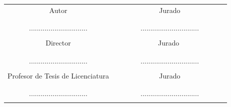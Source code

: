 \begin{center}
\begin{tabular}{|c|c|}
\hline
Autor &  \,\,\,\,\, \,\,\,\,\,\,\,\,\, \,\,\,\,\,\,\,\,\,\,\,\,\,\,\,\,\,\,Jurado \,\,\,\,\,\,\,\,\,\,\,\,\,\,\,\,\,\,\,\, \,\,\,\,\,\,\,\,\,\,\,\, \\
&            \\
       &            \\
  ..............................            &     ..............................          \\
       &            \\

\hline
Director &      \,\,\,\,\, \,\,\,\,\,\,\,\,\, \,\,\,\,\,\,\,\,\,\,\,\,\,\,\,\,\,\,Jurado \,\,\,\,\, \,\,\,\,\,\,\,\,\,\,\,\,\,\,\,\,\,\,\,\, \,\,\,\,\,\,\,\\
&            \\
       &            \\
  ..............................            &       ..............................        \\
         &            \\
 \hline
Profesor de Tesis de Licenciatura &  \,\,\,\,\,\,\, \,\,\,\,\, \,\,\,\,\,\,\,\,\,\,\,\,\,\,\,\,\,\,\,\,Jurado \,\,\,\,\,\,\,\,\,\,\,\,\,\,\,\,\,\,\,\,\,\,\,\,\,\,\, \,\,\,\,\,\\
&            \\
       &            \\
  ..............................            &      ..............................         \\
         &            \\
\hline
\end{tabular}
\end{center}
